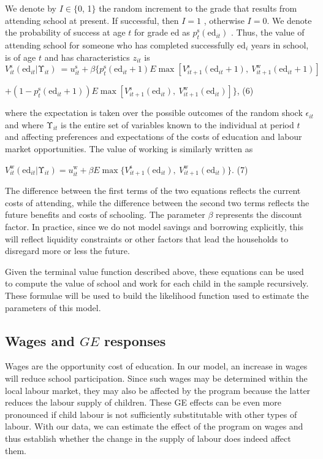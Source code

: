 \documentclass{handoutForSolutions}
\begin{document}
We denote by $I\in\{0$, 1$\}$ the random increment to the grade that results from attending school at present. If successful, then $I=1$ , otherwise $I=0$. We denote the probability of success at age $t$ for grade ed as $p_{t}^{\mathrm{s}}(\mathrm{e}\mathrm{d}_{it})$ .
Thus, the value of attending school for someone who has completed successfully $\mathrm{e}\mathrm{d}_{i}$ years in school, is of age $t$ and has characteristics $z_{it}$ is
$$
V_{it}^{\mathrm{s}}(\mathrm{e}\mathrm{d}_{it}|\mathrm{\Upsilon}_{it})\ =u_{it}^{\mathrm{s}}+\beta\{p_{t}^{\mathrm{s}}(\mathrm{e}\mathrm{d}_{it}+1)E\max[V_{it+1}^{\mathrm{s}}(\mathrm{e}\mathrm{d}_{it}+1),\ V_{it+1}^{\mathrm{w}}(\mathrm{e}\mathrm{d}_{it}+1)]
$$
\begin{center}
$+(1-p_{t}^{\mathrm{s}}(\displaystyle \mathrm{e}\mathrm{d}_{it}+1))E\max[V_{it+1}^{\mathrm{s}}(\mathrm{e}\mathrm{d}_{it}),\ V_{it+1}^{\mathrm{w}}(\mathrm{e}\mathrm{d}_{it})]\}$,   (6)
\end{center}
where the expectation is taken over the possible outcomes of the random shock $\epsilon_{it}$ and where $\mathrm{\Upsilon}_{it}$ is the entire set of variables known to the individual at period $t$ and affecting preferences and expectations of the costs of education and labour market opportunities. The value of working is similarly written as
\begin{center}
$V_{it}^{\mathrm{w}}(\displaystyle \mathrm{e}\mathrm{d}_{it}|\mathrm{\Upsilon}_{it})=u_{it}^{\mathrm{w}}+\beta E\max\{V_{it+1}^{\mathrm{s}}(\mathrm{e}\mathrm{d}_{it}),\ V_{it+1}^{\mathrm{w}}(\mathrm{e}\mathrm{d}_{it})\}$.   (7)
\end{center}
The difference between the first terms of the two equations reflects the current costs of attending, while the difference between the second two terms reflects the future benefits and costs of schooling. The parameter $\beta$ represents the discount factor. In practice, since we do not model savings and borrowing explicitly, this will reflect liquidity constraints or other factors that lead the households to disregard more or less the future.

Given the terminal value function described above, these equations can be used to compute the value of school and work for each child in the sample recursively. These formulae will be used to build the likelihood function used to estimate the parameters of this model.

\subsection{ Wages and $GE$  responses}
Wages are the opportunity cost of education. In our model, an increase in wages will reduce school participation. Since such wages may be determined within the local labour market, they may also be affected by the program because the latter reduces the labour supply of children. These GE effects can be even more pronounced if child labour is not sufficiently substitutable with other types of labour. With our data, we can estimate the effect of the program on wages and thus establish whether the change in the supply of labour does indeed affect them.
\end{document}

